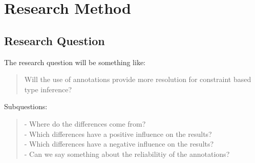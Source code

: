 \documentclass[../main.tex]{subfiles}
\begin{document}
    \chapter{Research Method}\label{chap:research_method}


        
    
    
    \section{Research Question}
    The research question will be something like: \\
    \begin{quote}
        Will the use of annotations\footnotemark{} provide more resolution for constraint based type inference?
    \end{quote}
    Subquestions:
    \begin{quote}
        - Where do the differences come from?
        \\
        - Which differences have a positive influence on the results?
        \\
        - Which differences have a negative influence on the results?
        \\
        - Can we say something about the reliabilitiy of the annotations?
    \end{quote}
        
\end{document}
